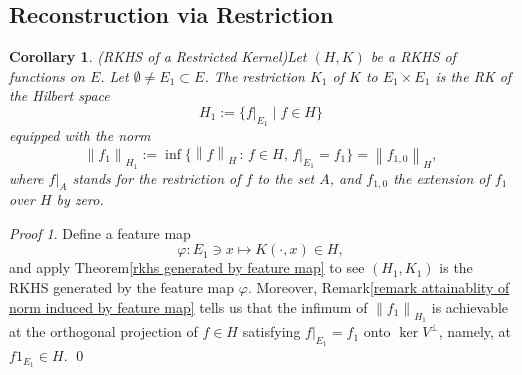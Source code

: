 \documentclass[a4paper,12pt]{article}
\newtheorem{cor}[thm]{Corollary}
\theoremstyle{remark}
\newtheorem*{prf}{Proof}
\theoremstyle{definition}
\theoremstyle{definition}
\theoremstyle{definition}
\newcommand{\norm}[1]{\left\| #1 \right\|}
\begin{document}
\subsection{Reconstruction via Restriction}
\begin{cor} (RKHS of a Restricted Kernel)\label{rkhs of restricted kernel}
	Let \( (H,K) \) be a RKHS of functions on \( E \). Let \( \emptyset \neq E_1 \subset E \). The restriction \( K_1 \) of \( K \) to \( E_1 \times E_1 \) is the RK of the Hilbert space
	\begin{equation*}
		H_1 := \{f|_{E_1} \mid f \in H \}
	\end{equation*}
	equipped with the norm
	\begin{equation*}
		\norm{f_1}_{H_1} := \inf \{\norm{f}_{H} \,:\, f \in H ,\, f|_{E_1} = f_1\} = \norm{f_{1,0}}_H,
	\end{equation*}
	where \( f|_{A} \) stands for the restriction of \( f \) to the set \( A \), and \( f_{1,0} \) the extension of \( f_1 \) over \( H \) by zero.
\end{cor}
\begin{prf}
	Define a feature map
	\begin{equation*}
		\varphi: E_1 \ni x \mapsto K(\cdot ,x) \in H,
	\end{equation*}
	and apply Theorem\ref{rkhs generated by feature map} to see \( (H_1, K_1) \) is the RKHS generated by the feature map \( \varphi \). Moreover, Remark\ref{remark attainablity of norm induced by feature map} tells us that the infimum of \( \norm{f_1}_{H_1} \) is achievable at the orthogonal projection  of \( f \in H \) satisfying \( f|_{E_1} = f_1 \) onto \( \ker V ^{\perp } \), namely, at \( f 1_{E_1} \in H \).
	\qed\end{prf}
\end{document}
